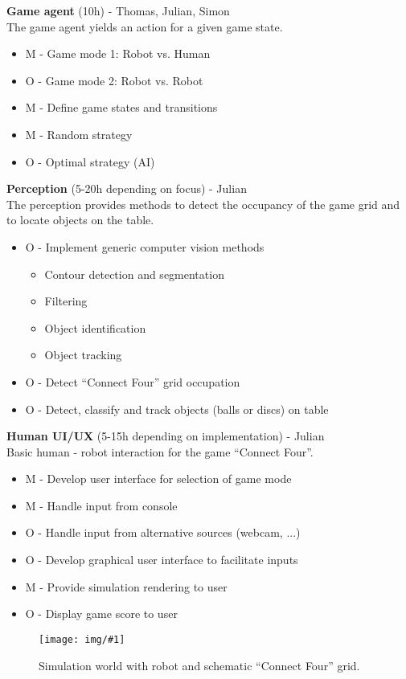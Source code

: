 \documentclass[11pt,pdftex,a4paper]{article}
\newcommand{\image}[1]{


\begin{center}
	\texttt{[image: img/\#1]}
\end{center}
}
\begin{document}
	\noindent
	\textbf{Game agent} (10h) - Thomas, Julian, Simon\\
	The game agent yields an action for a given game state.
	\begin{itemize}
	\item M - Game mode 1:  Robot vs. Human
	\item O - Game mode 2:  Robot vs. Robot
	\item M - Define game states and transitions
	\item M - Random strategy
	\item O - Optimal strategy (AI)
	\end{itemize}
	
	\noindent
	\textbf{Perception} (5-20h depending on focus) - Julian\\
	The perception provides methods to detect the occupancy of the game grid and to locate objects on the table.
	\begin{itemize}
	\item O - Implement generic computer vision methods
		\begin{itemize}
		\item Contour detection and segmentation
		\item Filtering
		\item Object identification
		\item Object tracking	
		\end{itemize}
	\item O - Detect ``Connect Four'' grid occupation
	\item O - Detect, classify and track objects (balls or discs) on table
	\end{itemize}
	
	\noindent
	\textbf{Human UI/UX} (5-15h depending on implementation) - Julian\\
	Basic human - robot interaction for the game ``Connect Four''.
	\begin{itemize}
	\item M - Develop user interface for selection of game mode
	\item M - Handle input from console
	\item O - Handle input from alternative sources (webcam, ...)	
	\item O - Develop graphical user interface to facilitate inputs
	\item M - Provide simulation rendering to user
	\item O - Display game score to user
	\end{itemize}
	
	\begin{figure}[H]
	\image{Connect-4-concept}
	\caption{Simulation world with robot and schematic ``Connect Four'' grid.}
	\end{figure}
\end{document}
